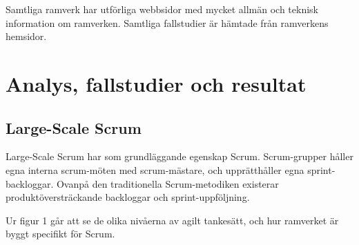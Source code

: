 		Samtliga ramverk har utförliga webbsidor med mycket allmän och teknisk information om ramverken. Samtliga fallstudier är hämtade från ramverkens hemsidor.
		
	
	
\newpage
\section{Analys, fallstudier och resultat}
	
	
	\subsection{Large-Scale Scrum}
	
	
		Large-Scale Scrum har som grundläggande egenskap Scrum. Scrum-grupper håller egna interna scrum-möten med scrum-mästare, och upprätthåller egna sprint-backloggar. Ovanpå den traditionella Scrum-metodiken existerar produktöversträckande backloggar och sprint-uppföljning.
		
		Ur figur 1 går att se de olika nivåerna av agilt tankesätt, och hur ramverket är byggt specifikt för Scrum. \cite{less_overview}
		
